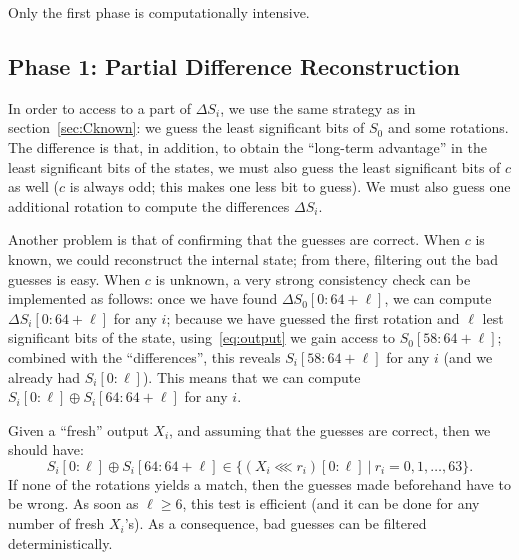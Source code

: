 \documentclass[preprint,svgnames]{iacrtrans}
\begin{document}
\noindent Only the first phase is computationally intensive. 

\subsection{Phase 1: Partial Difference Reconstruction}

In order to access to a part of $\Delta S_i$, we use the same strategy as in
section~\ref{sec:Cknown}: we guess the least significant bits of $S_0$ and some
rotations. The difference is that, in addition, to obtain the ``long-term
advantage'' in the least significant bits of the states, we must also guess the
least significant bits of $c$ as well ($c$ is always odd; this makes one less
bit to guess). We must also guess one additional rotation to compute the
differences $\Delta S_i$.

Another problem is that of confirming that the guesses are correct. When $c$ is
known, we could reconstruct the internal state; from there, filtering out the
bad guesses is easy. When $c$ is unknown, a very strong consistency check can be
implemented as follows: once we have found $\Delta S_0[0:64+\ell]$, we can
compute $\Delta S_i[0:64+\ell]$ for any $i$; because we have guessed the first
rotation and $\ell$ lest significant bits of the state, using~\eqref{eq:output}
we gain access to $S_0[58:64+\ell]$; combined with the ``differences'', this
reveals $S_i[58:64+\ell]$ for any $i$ (and we already had $S_i[0:\ell]$). This
means that we can compute $S_i[0:\ell] \oplus S_i[64:64+\ell]$ for any $i$.

Given a ``fresh'' output $X_i$, and assuming that the guesses are correct, then we should have:
\begin{equation}\label{eq:consistency}
  S_i[0:\ell] \oplus S_i[64:64+\ell] \in \bigl\{ (X_i \lll r_i)[0:\ell]~|~r_i=0, 1, \dots, 63 \bigr\}.
\end{equation}
If none of the rotations yields a match, then the guesses made beforehand have
to be wrong. As soon as $\ell \geq 6$, this test is efficient (and it can be
done for any number of fresh $X_i$'s). As a consequence, bad guesses can be
filtered deterministically.
\end{document}
